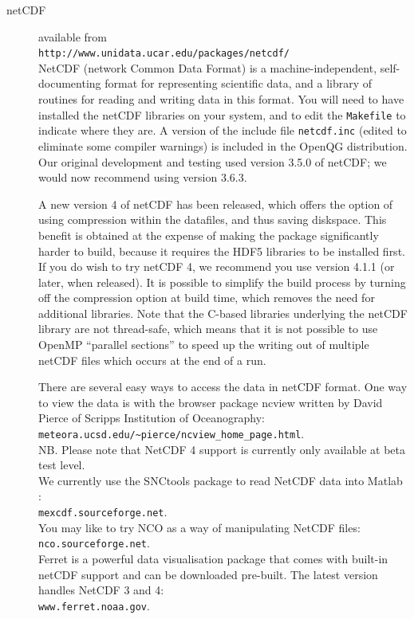 \documentclass[11pt, a4paper,twoside]{article}
\numberwithin{equation}{section}
\begin{document}
\begin{description}
\item[netCDF] available from\\
\verb=http://www.unidata.ucar.edu/packages/netcdf/=\\
NetCDF (network Common Data Format) is a machine-independent, self-documenting format for representing scientific data, and a library of routines for reading and writing data in this format.
You will need to have installed the netCDF libraries on your system, and to edit the \verb=Makefile= to indicate where they are.
A version of the include file \verb=netcdf.inc= (edited to eliminate some compiler warnings) is included in the OpenQG distribution.
Our original development and testing used version 3.5.0 of netCDF; we would now recommend using version 3.6.3.

A new version 4 of netCDF has been released, which offers the option of using compression within the datafiles, and thus saving diskspace. 
This benefit is obtained at the expense of making the package significantly harder to build, because it requires the HDF5 libraries to be installed first. 
If you do wish to try netCDF 4, we recommend you use version 4.1.1 (or later, when released). 
It is possible to simplify the build process by turning off the compression option at build time, which
removes the need for additional libraries.
Note that the C-based libraries underlying the netCDF library are not thread-safe, which means that it is not possible to use OpenMP ``parallel sections'' to speed up the writing out of multiple netCDF files which occurs at the end of a run.

There are several easy ways to access the data in netCDF format.
One way to view the data is with the browser package ncview written by David Pierce
of Scripps Institution of Oceanography:\\
\verb=meteora.ucsd.edu/~pierce/ncview_home_page.html=.\\
NB. Please note that NetCDF 4 support is currently only available at beta test level.\\
We currently use the  SNCtools package to read NetCDF data into Matlab :\\
\verb=mexcdf.sourceforge.net=.\\
You may like to try NCO as a way of manipulating NetCDF files:\\
\verb=nco.sourceforge.net=.\\
Ferret is a powerful data visualisation package that comes with built-in netCDF support and can be downloaded pre-built. The latest version handles NetCDF 3 and 4:\\
\verb=www.ferret.noaa.gov=.


\end{description}
\end{document}

